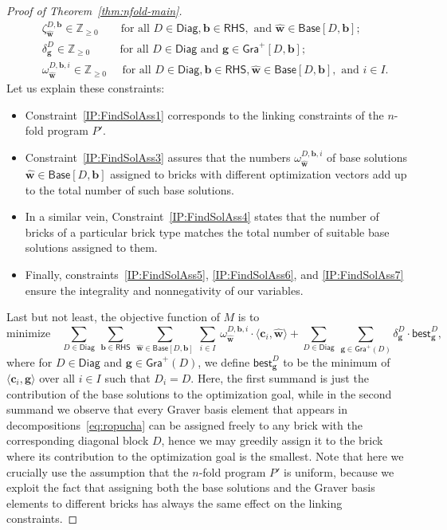 \documentclass{theoretics}
\renewcommand{\geq}{\geqslant}
\newcommand{\Z}{\mathbb{Z}}
\newcommand{\Zn}{\Z_{\geq 0}}
\newcommand{\tup}[1]{{\mathbf{#1}}}
\newcommand{\ww}{\tup w}
\newcommand{\whww}{{\widehat{\ww}}}
\newcommand{\bb}{\tup b}
\renewcommand{\gg}{\tup g}
\newcommand{\cc}{\tup c}
\newcommand{\RHS}{\mathsf{RHS}}
\newcommand{\Diag}{\mathsf{Diag}}
\newcommand{\Base}{\mathsf{Base}}
\newcommand{\Gra}{\mathsf{Gra}^+}
\newcommand{\rev}{\mathsf{best}}
\newcommand{\sca}[2]{\langle #1,#2\rangle}
\begin{document}
\begin{proof}[Proof of Theorem~\ref{thm:nfold-main}]
\begin{align*}
&\quad\ \ \zeta^{D,\bb}_{\whww} \in \Zn \qquad \textrm{for all }D\in \Diag, \bb\in \RHS, \textrm{ and } \whww\in \Base[D,\bb]; &
\tag{C4} \label{IP:FindSolAss5}\\
& \quad\ \ \delta^D_\gg \in \Zn\qquad\ \ \   \textrm{for all }D\in \Diag \textrm{ and } \gg\in \Gra[D,\bb]; &
\tag{C5} \label{IP:FindSolAss6}\\
& \quad\ \ \omega^{D,\bb,i}_{\whww} \in \Zn \quad\ \,\textrm{for all }D\in \Diag, \bb\in \RHS, \whww\in \Base[D,\bb], \textrm{ and } i\in I. &
\tag{C6} \label{IP:FindSolAss7}
\end{align*}
Let us explain these constraints:
\begin{itemize}[nosep]
\item Constraint~\cref{IP:FindSolAss1} corresponds to the linking constraints of the $n$-fold program $P'$.
\item  Constraint~\cref{IP:FindSolAss3} assures that the numbers $\omega^{D,\bb,i}_{\whww}$ of base solutions $\whww\in \Base[D,\bb]$ assigned to bricks with different optimization vectors add up to the total number of such base solutions.
\item In a similar vein, Constraint~\cref{IP:FindSolAss4} states that
 the number of bricks of a particular brick type matches the total number of suitable base solutions assigned to them.
\item Finally, constraints~\cref{IP:FindSolAss5}, \cref{IP:FindSolAss6}, and \cref{IP:FindSolAss7} ensure the integrality and nonnegativity of our variables.
\end{itemize}
Last but not least, the objective function of $M$ is to
\begin{equation*}
\text{minimize}\quad \sum_{D\in \Diag}\ \sum_{\bb\in \RHS}\ \sum_{\whww\in \Base[D,\bb]}\ \sum_{i\in I}\ \omega^{D,\bb,i}_{\whww}\cdot \sca{\cc_i}{\whww} +\sum_{D\in \Diag}\ \sum_{\gg\in \Gra(D)}  \delta^D_\gg\cdot  \rev^{D}_\gg,
\end{equation*}
where for $D\in \Diag$ and $\gg\in \Gra(D)$, we define $\rev^D_\gg$ to be the minimum of $\sca{\cc_i}{\gg}$ over all $i\in I$ such that $D_i=D$. Here, the first summand is just the contribution of the base solutions to the optimization goal, while in the second summand we observe that every Graver basis element that appears in decompositions~\cref{eq:ropucha} can be assigned freely to any brick with the corresponding diagonal block $D$, hence we may greedily assign it to the brick where its contribution to the optimization goal is the smallest. Note that here we crucially use the assumption that the $n$-fold program $P'$ is uniform, because we exploit the fact that assigning both the base solutions and the Graver basis elements to different bricks has always the same effect on the linking constraints.


\end{proof}
\end{document}

